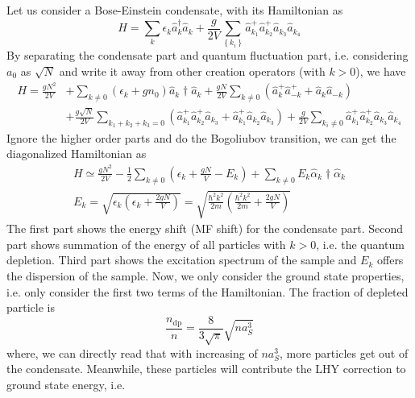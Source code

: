 Let us consider a Bose-Einstein condensate, with its Hamiltonian as
\begin{equation}
H=\sum_k\epsilon_k\hat{a}_k^\dagger\hat{a}_k+\frac{g}{2V}\sum _{\left\{k_i\right\}}\hat{a}_{k_1}^+\hat{a}_{k_2}^+\hat{a}_{k_3}\hat{a}_{k_4}
\end{equation}
By separating the condensate part and quantum fluctuation part, i.e. considering $a_0$ as $\sqrt{N}$ and write it away from other creation operators (with $k>0$), we have
\begin{equation}
\begin{split}
H=\frac{g N^2}{2V}&+\sum_{k\neq0}\left(\epsilon_k+gn_0\right)\hat{a}_k\dagger\hat{a}_k+\frac{gN}{2V}\sum_{k\neq0}\left(\hat{a}_k^+\hat{a}_{-k}^++\hat{a}_k\hat{a}_{-k}\right)\\
&+\frac{g\sqrt{N}}{2V}\sum_{k_1+k_2+k_3=0}\left(\hat{a}_{k_1}^+\hat{a}_{k_2}^+\hat{a}_{k_3}+\hat{a}_{k_1}^+\hat{a}_{k_2}\hat{a}_{k_3}\right)+\frac{g}{2V}\sum_{k_i\neq0}\hat{a}_{k_1}^+\hat{a}_{k_2}^+\hat{a}_{k_3}\hat{a}_{k_4}
\end{split}
\end{equation}
Ignore the higher order parts and do the Bogoliubov transition, we can get the diagonalized Hamiltonian as
\begin{equation}
\begin{split}
H\simeq \frac{g N^2}{2V}-\frac{1}{2}\sum _{k\neq 0} \left(\epsilon _k+\frac{g N}{V}-E_k\right)+\sum _{k\neq 0} E_k\hat{\alpha }_k\dagger\hat{\alpha
}_k\\
E_k=\sqrt{\epsilon _k\left(\epsilon _k+\frac{2 g N}{V}\right)}=\sqrt{\frac{\hbar ^2k^2}{2m}\left(\frac{\hbar ^2k^2}{2m}+\frac{2 g N}{V}\right)}
\end{split}
\end{equation}
The first part shows the energy shift (MF shift) for the condensate part. Second part shows summation of the energy of all particles with $k>0$, i.e. the quantum depletion. Third part shows the excitation spectrum of the sample and $E_k$ offers the dispersion of the sample. Now, we only consider the ground state properties, i.e. only consider the first two terms of the Hamiltonian. The fraction of depleted particle is
\begin{equation}
\frac{n_{\text{dp}}}{n}=\frac{8}{3\sqrt{\pi }}\sqrt{n a_S^3}
\end{equation}
where, we can directly read that with increasing of $n a_S^3$, more particles get out of the condensate. Meanwhile, these particles will contribute the LHY correction to ground state energy, i.e.

